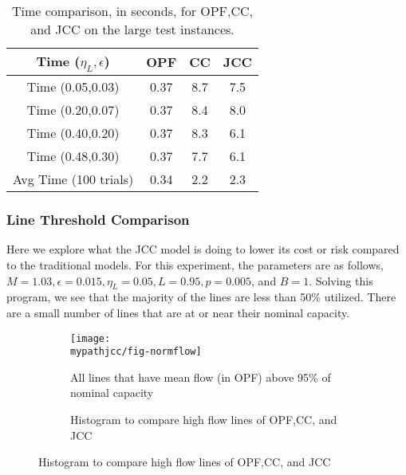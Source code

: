 \begin{table}
\centering
\begin{tabular}{| c| c c c| }
\hline
Time ($\eta_L,\epsilon$) & OPF & CC & JCC \\
\hline
\hline
Time (0.05,0.03)& 0.37  & 8.7 & 7.5 \\
Time (0.20,0.07)& 0.37  & 8.4 & 8.0 \\
Time (0.40,0.20)& 0.37  & 8.3 & 6.1 \\
Time (0.48,0.30)& 0.37  & 7.7 & 6.1 \\
\hline
\hline
Avg Time (100 trials)& 0.34  & 2.2 & 2.3 \\
\hline
\end{tabular}
\caption{Time comparison, in seconds, for OPF,CC, and JCC on the large test instances.}\label{solve_time}
\end{table}

\subsubsection*{Line Threshold Comparison}
Here we explore what the JCC model is doing to lower its cost or risk compared to the traditional models.  For this experiment, the parameters are as follows, $M=1.03, \epsilon=0.015, \eta_L=0.05, L=0.95, p=0.005$, and $B=1$.  Solving this program, we see that the majority of the lines are less than 50\% utilized.  There are a small number of lines that are at or near their nominal capacity.


\begin{figure}
\centering
\begin{subfigure}[b]{0.4\textwidth}
\texttt{[image: \\mypathjcc/fig-normflow]}
\caption{All lines that have mean flow (in OPF) above 95\% of nominal capacity}\label{solve_shadow}
\end{subfigure}
\hspace{15px}
\begin{subfigure}[b]{0.4\textwidth}
\centering

\caption{Histogram to compare high flow lines of OPF,CC, and JCC}\label{histogram}
\end{subfigure}
\end{figure}

